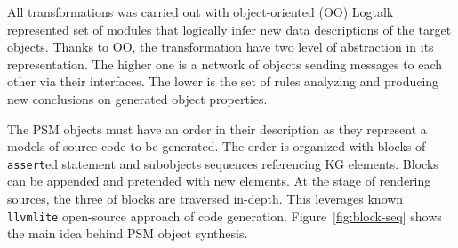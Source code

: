 \documentclass[
]{ceurart}
\begin{document}
All transformations was carried out with object-oriented (OO) Logtalk represented set of modules that logically infer new data descriptions of the target objects.  Thanks to OO, the transformation have two level of abstraction in its representation.  The higher one is a network of objects sending messages to each other via their interfaces.  The lower is the set of rules analyzing and producing new conclusions on generated object properties.

The PSM objects must have an order in their description as they represent a models of source code to be generated.  The order is organized with blocks of \verb|assert|ed statement and subobjects sequences referencing KG elements.  Blocks can be appended and pretended with new elements.  At the stage of rendering sources, the three of blocks are traversed in-depth.  This leverages known \verb|llvmlite| open-source approach of code generation.  Figure~\ref{fig:block-seq} shows the main idea behind PSM object synthesis.
\end{document}

